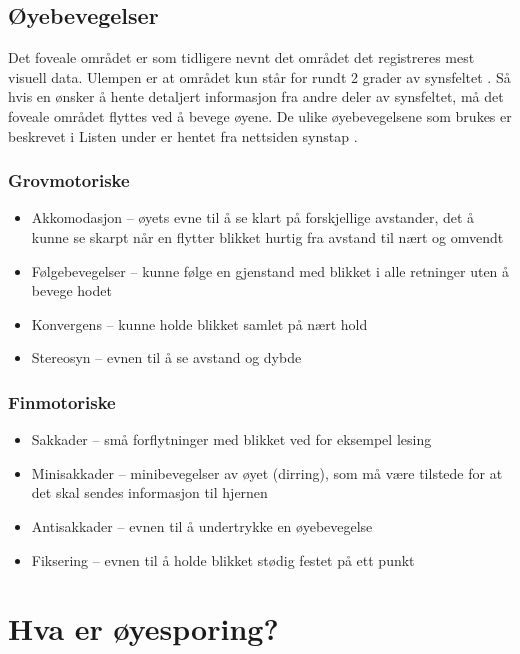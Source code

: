 \subsection{Øyebevegelser}

Det foveale området er som tidligere nevnt det området det registreres mest visuell data. Ulempen er at området kun står for rundt 2 grader av synsfeltet \cite{Backg0:online}. Så hvis en ønsker å hente detaljert informasjon fra andre deler av synsfeltet, må det foveale området flyttes ved å bevege øyene. De ulike øyebevegelsene som brukes er beskrevet i Listen under er hentet fra nettsiden synstap \cite{sanse7:online}.

\subsubsection{Grovmotoriske}
\begin{itemize}
\item Akkomodasjon – øyets evne til å se klart på forskjellige avstander, det å kunne se skarpt når en flytter blikket hurtig fra avstand til nært og omvendt
\item Følgebevegelser – kunne følge en gjenstand med blikket i alle retninger uten å bevege hodet
\item Konvergens – kunne holde blikket samlet på nært hold
\item Stereosyn – evnen til å se avstand og dybde
\end{itemize}
\subsubsection{Finmotoriske}
\begin{itemize}
\item Sakkader – små forflytninger med blikket ved for eksempel lesing
\item Minisakkader – minibevegelser av øyet (dirring), som må være tilstede for at det skal sendes informasjon til hjernen
\item Antisakkader – evnen til å undertrykke en øyebevegelse
\item Fiksering – evnen til å holde blikket stødig festet på ett punkt
\end{itemize}



\section{Hva er øyesporing?}


